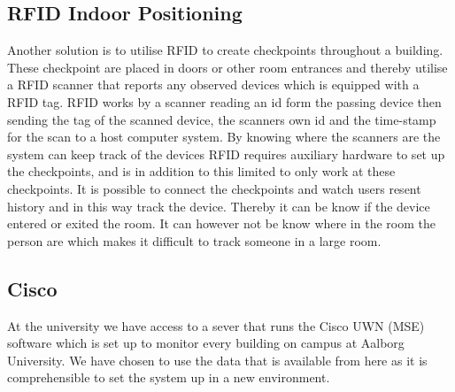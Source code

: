 \subsection{RFID Indoor Positioning}
Another solution is to utilise RFID to create checkpoints throughout a building. These checkpoint are placed in doors or other room entrances and thereby utilise a RFID scanner that reports any observed devices which is equipped with a RFID tag\cite{indoor_bin}. 
RFID works by a scanner reading an id form the passing device then sending the tag of the scanned device, the scanners own id and the time-stamp for the scan to a host computer system. By knowing where the scanners are the system can keep track of the devices%
RFID requires auxiliary hardware to set up the checkpoints, and is in addition to this limited to only work at these checkpoints. It is possible to connect the checkpoints and watch users resent history and in this way track the device. Thereby it can be know if the device entered or exited the room. It can however not be know where in the room the person are which makes it difficult to track someone in a large room.




\subsection{Cisco}\label{subsec:cisco}
At the university we have access to a sever that runs the Cisco UWN (MSE) software which is set up to monitor every building on campus at Aalborg University. We have chosen to use the data that is available from here as it is comprehensible to set the system up in a new environment.


